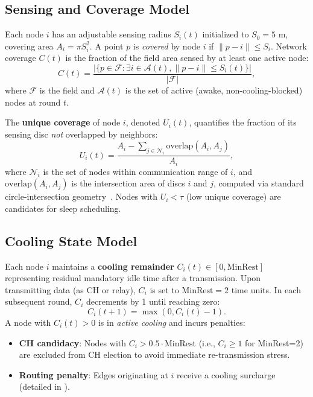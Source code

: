 \subsection{Sensing and Coverage Model}
Each node $i$ has an adjustable sensing radius $S_i(t)$ initialized to $S_0=5$ m, covering area $A_i = \pi S_i^2$. A point $p$ is \emph{covered} by node $i$ if $\|p - i\| \le S_i$. Network coverage $C(t)$ is the fraction of the field area sensed by at least one active node:
\begin{equation}
C(t) = \frac{|\{p \in \mathcal{F} : \exists i \in \mathcal{A}(t), \|p-i\| \le S_i(t)\}|}{|\mathcal{F}|},
\end{equation}
where $\mathcal{F}$ is the field and $\mathcal{A}(t)$ is the set of active (awake, non-cooling-blocked) nodes at round $t$.

The \textbf{unique coverage} of node $i$, denoted $U_i(t)$, quantifies the fraction of its sensing disc \emph{not} overlapped by neighbors:
\begin{equation}
U_i(t) = \frac{A_i - \sum_{j \in \mathcal{N}_i} \text{overlap}(A_i, A_j)}{A_i},
\label{eq:unique-coverage}
\end{equation}
where $\mathcal{N}_i$ is the set of nodes within communication range of $i$, and $\text{overlap}(A_i,A_j)$ is the intersection area of discs $i$ and $j$, computed via standard circle-intersection geometry~\cite{weisstein_circle}. Nodes with $U_i < \tau$ (low unique coverage) are candidates for sleep scheduling.

\subsection{Cooling State Model}
\label{subsec:cooling-model}
Each node $i$ maintains a \textbf{cooling remainder} $C_i(t) \in [0, \text{MinRest}]$ representing residual mandatory idle time after a transmission. Upon transmitting data (as CH or relay), $C_i$ is set to $\text{MinRest}=2$ time units. In each subsequent round, $C_i$ decrements by 1 until reaching zero:
\begin{equation}
C_i(t+1) = \max(0, C_i(t) - 1).
\label{eq:cooling-decrement}
\end{equation}
A node with $C_i(t) > 0$ is in \emph{active cooling} and incurs penalties:
\begin{itemize}[noitemsep]
  \item \textbf{CH candidacy}: Nodes with $C_i > 0.5 \cdot \text{MinRest}$ (i.e., $C_i \ge 1$ for MinRest=2) are excluded from CH election to avoid immediate re-transmission stress.
  \item \textbf{Routing penalty}: Edges originating at $i$ receive a cooling surcharge (detailed in ).
\end{itemize}

